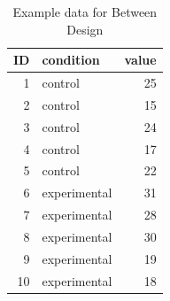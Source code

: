 \begin{table}[ht]
   \centering
   \caption{Example data for Between Design}
   \begin{tabular}{rlr}
      \hline
      ID & condition    & value \\
      \hline
      1  & control      & 25    \\
      2  & control      & 15    \\
      3  & control      & 24    \\
      4  & control      & 17    \\
      5  & control      & 22    \\
      6  & experimental & 31    \\
      7  & experimental & 28    \\
      8  & experimental & 30    \\
      9  & experimental & 19    \\
      10 & experimental & 18    \\
      \hline
   \end{tabular}
   \label{tbl::19_02}
\end{table}

